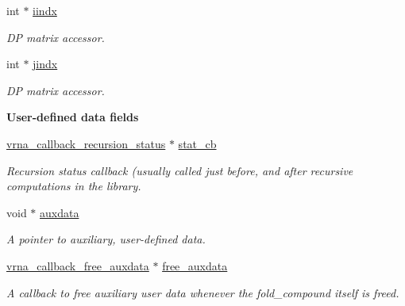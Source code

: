 \begin{Indent}
\begin{DoxyCompactItemize}
\mbox{\label{group__fold__compound_afdead4cf55c882d3497e779573e17e03}} 
int $\ast$ \hyperlink{group__fold__compound_afdead4cf55c882d3497e779573e17e03}{iindx}
\begin{DoxyCompactList}\small\item\em DP matrix accessor. \end{DoxyCompactList}\item 
\mbox{\label{group__fold__compound_a5037235dee512efd85ca543780bbca1a}} 
int $\ast$ \hyperlink{group__fold__compound_a5037235dee512efd85ca543780bbca1a}{jindx}
\begin{DoxyCompactList}\small\item\em DP matrix accessor. \end{DoxyCompactList}\end{DoxyCompactItemize}
\end{Indent}
\begin{Indent}\textbf{ User-\/defined data fields}\par
\begin{DoxyCompactItemize}
\item 
\hyperlink{group__fold__compound_gac86036fa8cad1108832335063243cdc8}{vrna\+\_\+callback\+\_\+recursion\+\_\+status} $\ast$ \hyperlink{group__fold__compound_a87a83f6795b569000efcbe65acc3dd81}{stat\+\_\+cb}
\begin{DoxyCompactList}\small\item\em Recursion status callback (usually called just before, and after recursive computations in the library. \end{DoxyCompactList}\item 
void $\ast$ \hyperlink{group__fold__compound_a20048e0c369e9f24b55423d600037c68}{auxdata}
\begin{DoxyCompactList}\small\item\em A pointer to auxiliary, user-\/defined data. \end{DoxyCompactList}\item 
\hyperlink{group__fold__compound_ga7806651f51b195013839a218b3bbd5a3}{vrna\+\_\+callback\+\_\+free\+\_\+auxdata} $\ast$ \hyperlink{group__fold__compound_a8e84dbabab016ecd74da6c38cb94e816}{free\+\_\+auxdata}
\begin{DoxyCompactList}\small\item\em A callback to free auxiliary user data whenever the fold\+\_\+compound itself is free\textquotesingle{}d. \end{DoxyCompactList}\end{DoxyCompactItemize}
\end{Indent}
